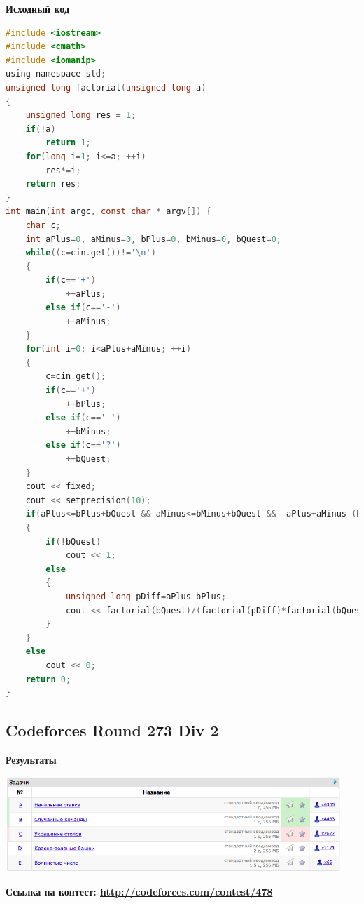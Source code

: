\documentclass[a4paper,12pt]{article}
\begin{document}
\newpage
\textbf{{\large Исходный код}} \\
\begin{lstlisting}[language=C]
#include <iostream>
#include <cmath>
#include <iomanip>
using namespace std;
unsigned long factorial(unsigned long a)
{
    unsigned long res = 1;
    if(!a)
        return 1;
    for(long i=1; i<=a; ++i)
        res*=i;
    return res;
}
int main(int argc, const char * argv[]) {
    char c;
    int aPlus=0, aMinus=0, bPlus=0, bMinus=0, bQuest=0;
    while((c=cin.get())!='\n')
    {
        if(c=='+')
            ++aPlus;
        else if(c=='-')
            ++aMinus;
    }
    for(int i=0; i<aPlus+aMinus; ++i)
    {
        c=cin.get();
        if(c=='+')
            ++bPlus;
        else if(c=='-')
            ++bMinus;
        else if(c=='?')
            ++bQuest;
    }
    cout << fixed;
    cout << setprecision(10);
    if(aPlus<=bPlus+bQuest && aMinus<=bMinus+bQuest &&  aPlus+aMinus-(bPlus+bMinus)-bQuest == 0)
    {
        if(!bQuest)
            cout << 1;
        else
        {
            unsigned long pDiff=aPlus-bPlus;
            cout << factorial(bQuest)/(factorial(pDiff)*factorial(bQuest-pDiff))/pow(2, bQuest);
        }
    }
    else
        cout << 0;
    return 0;
}
\end{lstlisting}

%
%

\newpage
\subsection{Codeforces Round 273 Div 2}

\textbf{{\large Результаты}} \\
\begin{center}
\includegraphics[width=0.95\textwidth]{C_273/A_C_273_result.png}\\ [1cm]
\end{center}

\textbf{{\large Ссылка на контест: \url{http://codeforces.com/contest/478}}}
\end{document}
